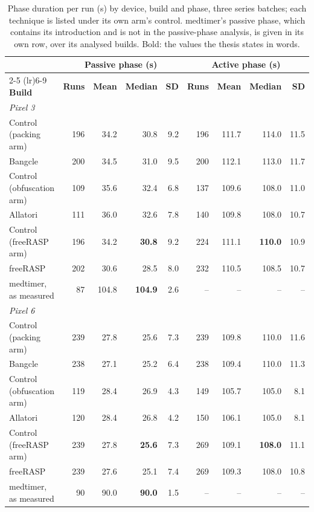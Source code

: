 \begin{table}[t]
\centering
\small
\caption{Phase duration per run (s) by device, build and phase, three series batches; each technique is listed under its own arm's control. medtimer's passive phase, which contains its introduction and is not in the passive-phase analysis, is given in its own row, over its analysed builds. Bold: the values the thesis states in words.}
\label{tab:durations-device}
\begin{tabular}{lrrrrrrrr}
\toprule
 & \multicolumn{4}{c}{\textbf{Passive phase (s)}} & \multicolumn{4}{c}{\textbf{Active phase (s)}} \\
\cmidrule(lr){2-5} \cmidrule(lr){6-9}
\textbf{Build} & \textbf{Runs} & \textbf{Mean} & \textbf{Median} & \textbf{SD} & \textbf{Runs} & \textbf{Mean} & \textbf{Median} & \textbf{SD} \\
\midrule
\multicolumn{9}{l}{\textit{Pixel 3}} \\
Control (packing arm) & 196 & 34.2 & 30.8 & 9.2 & 196 & 111.7 & 114.0 & 11.5 \\
Bangcle & 200 & 34.5 & 31.0 & 9.5 & 200 & 112.1 & 113.0 & 11.7 \\
Control (obfuscation arm) & 109 & 35.6 & 32.4 & 6.8 & 137 & 109.6 & 108.0 & 11.0 \\
Allatori & 111 & 36.0 & 32.6 & 7.8 & 140 & 109.8 & 108.0 & 10.7 \\
Control (freeRASP arm) & 196 & 34.2 & \textbf{30.8} & 9.2 & 224 & 111.1 & \textbf{110.0} & 10.9 \\
freeRASP & 202 & 30.6 & 28.5 & 8.0 & 232 & 110.5 & 108.5 & 10.7 \\
medtimer, as measured & 87 & 104.8 & \textbf{104.9} & 2.6 & – & – & – & – \\
\midrule
\multicolumn{9}{l}{\textit{Pixel 6}} \\
Control (packing arm) & 239 & 27.8 & 25.6 & 7.3 & 239 & 109.8 & 110.0 & 11.6 \\
Bangcle & 238 & 27.1 & 25.2 & 6.4 & 238 & 109.4 & 110.0 & 11.3 \\
Control (obfuscation arm) & 119 & 28.4 & 26.9 & 4.3 & 149 & 105.7 & 105.0 & 8.1 \\
Allatori & 120 & 28.4 & 26.8 & 4.2 & 150 & 106.1 & 105.0 & 8.1 \\
Control (freeRASP arm) & 239 & 27.8 & \textbf{25.6} & 7.3 & 269 & 109.1 & \textbf{108.0} & 11.1 \\
freeRASP & 239 & 27.6 & 25.1 & 7.4 & 269 & 109.3 & 108.0 & 10.8 \\
medtimer, as measured & 90 & 90.0 & \textbf{90.0} & 1.5 & – & – & – & – \\

\end{tabular}
\end{table}
